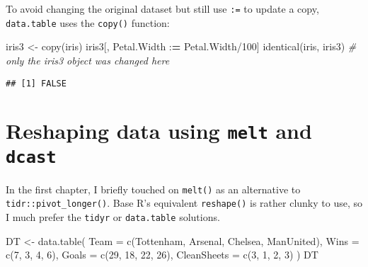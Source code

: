 \documentclass[
]{book}
\newenvironment{Shaded}{\begin{snugshade}}{\end{snugshade}}
\newcommand{\AttributeTok}[1]{\textcolor[rgb]{0.77,0.63,0.00}{#1}}
\newcommand{\CommentTok}[1]{\textcolor[rgb]{0.56,0.35,0.01}{\textit{#1}}}
\newcommand{\DecValTok}[1]{\textcolor[rgb]{0.00,0.00,0.81}{#1}}
\newcommand{\ErrorTok}[1]{\textcolor[rgb]{0.64,0.00,0.00}{\textbf{#1}}}
\newcommand{\FunctionTok}[1]{\textcolor[rgb]{0.00,0.00,0.00}{#1}}
\newcommand{\NormalTok}[1]{#1}
\newcommand{\OtherTok}[1]{\textcolor[rgb]{0.56,0.35,0.01}{#1}}
\newcommand{\SpecialCharTok}[1]{\textcolor[rgb]{0.00,0.00,0.00}{#1}}
\newcommand{\StringTok}[1]{\textcolor[rgb]{0.31,0.60,0.02}{#1}}
\begin{document}
To avoid changing the original dataset but still use \texttt{:=} to update a copy, \texttt{data.table} uses the \texttt{copy()} function:

\begin{Shaded}
\begin{Highlighting}[]
\NormalTok{iris3 }\OtherTok{\textless{}{-}} \FunctionTok{copy}\NormalTok{(iris)}
\NormalTok{iris3[, Petal.Width }\SpecialCharTok{:}\ErrorTok{=}\NormalTok{ Petal.Width}\SpecialCharTok{/}\DecValTok{100}\NormalTok{]}
\FunctionTok{identical}\NormalTok{(iris, iris3) }\CommentTok{\# only the iris3 object was changed here}
\end{Highlighting}
\end{Shaded}

\begin{verbatim}
## [1] FALSE
\end{verbatim}

\hypertarget{reshaping-data-using-melt-and-dcast}{%
\section{\texorpdfstring{Reshaping data using \texttt{melt} and \texttt{dcast}}{Reshaping data using melt and dcast}}\label{reshaping-data-using-melt-and-dcast}}

In the first chapter, I briefly touched on \texttt{melt()} as an alternative to \texttt{tidr::pivot\_longer()}. Base R's equivalent \texttt{reshape()} is rather clunky to use, so I much prefer the \texttt{tidyr} or \texttt{data.table} solutions.

\begin{Shaded}
\begin{Highlighting}[]
\NormalTok{DT }\OtherTok{\textless{}{-}} \FunctionTok{data.table}\NormalTok{(}
  \AttributeTok{Team =} \FunctionTok{c}\NormalTok{(}\StringTok{\textquotesingle{}Tottenham\textquotesingle{}}\NormalTok{, }\StringTok{\textquotesingle{}Arsenal\textquotesingle{}}\NormalTok{, }\StringTok{\textquotesingle{}Chelsea\textquotesingle{}}\NormalTok{, }\StringTok{\textquotesingle{}ManUnited\textquotesingle{}}\NormalTok{),}
  \AttributeTok{Wins =} \FunctionTok{c}\NormalTok{(}\DecValTok{7}\NormalTok{, }\DecValTok{3}\NormalTok{, }\DecValTok{4}\NormalTok{, }\DecValTok{6}\NormalTok{),}
  \AttributeTok{Goals =} \FunctionTok{c}\NormalTok{(}\DecValTok{29}\NormalTok{, }\DecValTok{18}\NormalTok{, }\DecValTok{22}\NormalTok{, }\DecValTok{26}\NormalTok{),}
  \AttributeTok{CleanSheets =} \FunctionTok{c}\NormalTok{(}\DecValTok{3}\NormalTok{, }\DecValTok{1}\NormalTok{, }\DecValTok{2}\NormalTok{, }\DecValTok{3}\NormalTok{)}
\NormalTok{)}
\NormalTok{DT}
\end{Highlighting}
\end{Shaded}
\end{document}
